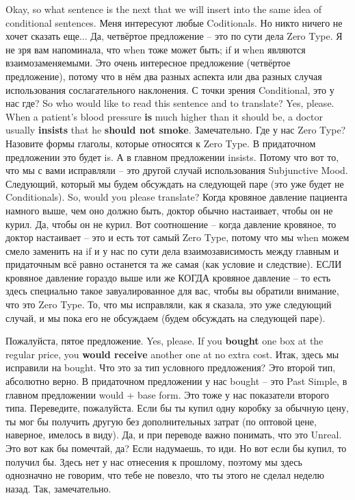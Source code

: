 \documentclass[main.tex]{subfiles}
\begin{document}
Okay, so what sentence is the next that we will insert into the same idea of conditional sentences.
Меня интересуют любые Coditionals.
Но никто ничего не хочет сказать еще...
Да, четвёртое предложение -- это по сути дела Zero Type.
Я не зря вам напоминала, что when тоже может быть;
if и when являются взаимозаменяемыми.
Это очень интересное предложение (четвёртое предложение), потому что в нём два разных аспекта или два разных случая использования сослагательного наклонения.
С точки зрения Conditional, это у нас где?
So who would like to read this sentence and to translate?
Yes, please.
When a patient's blood pressure \textbf{is} much higher than it should be, a doctor usually \textbf{insists} that he \textbf{should not smoke}.
Замечательно.
Где у нас Zero Type?
Назовите формы глаголы, которые относятся к Zero Type.
В придаточном предложении это будет is.
А в главном предложении insists.
Потому что вот то, что мы с вами исправляли -- это другой случай использования Subjunctive Mood.
Следующий, который мы будем обсуждать на следующей паре (это уже будет не Conditionals).
So, would you please translate?
Когда кровяное давление пациента намного выше, чем оно должно быть, доктор обычно настаивает, чтобы он не курил.
Да, чтобы он не курил.
Вот соотношение -- когда давление кровяное, то доктор настаивает -- это и есть тот самый Zero Type, потому что мы when можем смело заменить на if и у нас по сути дела взаимозависимость между главным и придаточным всё равно останется та же самая (как условие и следствие).
ЕСЛИ кровяное давление гораздо выше или же КОГДА кровяное давление -- то есть здесь специально такое завуалированное для вас, чтобы вы обратили внимание, что это Zero Type.
То, что мы исправляли, как я сказала, это уже следующий случай, и мы пока его не обсуждаем (будем обсуждать на следующей паре).

Пожалуйста, пятое предложение.
Yes, please.
If you \textbf{bought} one box at the regular price, you \textbf{would receive} another one at no extra cost.
Итак, здесь мы исправили на bought.
Что это за тип условного предложения?
Это второй тип, абсолютно верно.
В придаточном предложении у нас bought -- это Past Simple, в главном предложении would + base form.
Это тоже у нас показатели второго типа.
Переведите, пожалуйста.
Если бы ты купил одну коробку за обычную цену, ты мог бы получить другую без дополнительных затрат (по оптовой цене, наверное, имелось в виду).
Да, и при переводе важно понимать, что это Unreal.
Это вот как бы помечтай, да?
Если надумаешь, то иди.
Но вот если бы купил, то получил бы.
Здесь нет у нас отнесения к прошлому, поэтому мы здесь однозначно не говорим, что тебе не повезло, что ты этого не сделал неделю назад.
Так, замечательно.
\end{document}
